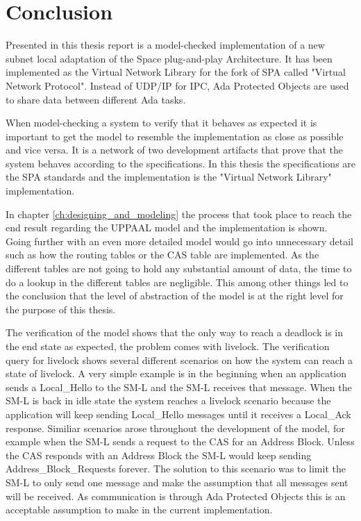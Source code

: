 \chapter{Conclusion}\label{ch:conclusion}
Presented in this thesis report is a model-checked implementation of a new
subnet local adaptation of the Space plug-and-play Architecture. It has been
implemented as the Virtual Network Library \cite{web:github-vn-lib} for the
fork of SPA called "Virtual Network Protocol". Instead of UDP/IP for IPC, Ada
Protected Objects are used to share data between different Ada tasks.

When model-checking a system to verify that it behaves as expected it is
important to get the model to resemble the implementation as close as possible
and vice versa. It is a network of two development artifacts that prove that the
system behaves according to the specifications. In this thesis the
specifications are the SPA standards and the implementation is the "Virtual
Network Library" implementation.

In chapter \ref{ch:designing_and_modeling} the process that took place to reach
the end result regarding the UPPAAL model and the implementation is
shown. Going further with an even more detailed model would go into
unnecessary detail such as how the routing tables or the CAS table are
implemented. As the different tables are not going to hold any substantial
amount of data, the time to do a lookup in the different tables are
negligible. This among other things led to the conclusion that the level of
abstraction of the model is at the right level for the purpose of this thesis.

The verification of the model shows that the only way to reach a deadlock is in
the end state as expected, the problem comes with livelock. The
verification query for livelock shows several different scenarios on how the
system can reach a state of livelock. A very simple example is in the beginning
when an application sends a Local\_Hello to the SM-L and the SM-L receives that
message. When the SM-L is back in idle state the system reaches a livelock
scenario because the application will keep sending Local\_Hello messages
until it receives a Local\_Ack response. Similiar scenarios arose throughout
the development of the model, for example when the SM-L sends a request to
the CAS for an Address Block. Unless the CAS responds with an Address Block the
SM-L would keep sending Address\_Block\_Requests forever. The solution to this
scenario was to limit the SM-L to only send one message and make the
assumption that all messages sent will be received. As communication is through
Ada Protected Objects this is an acceptable assumption to make in the current
implementation.

